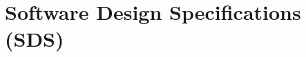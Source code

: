 \documentclass[11pt,twosided]{report}
\begin{document}
% 

% 


  
% 

% 

% 

\chapter{Software Design Specifications (SDS)}
\label{chap:sds}



\printbibliography[heading=bibintoc,title={References}]
\end{document}
